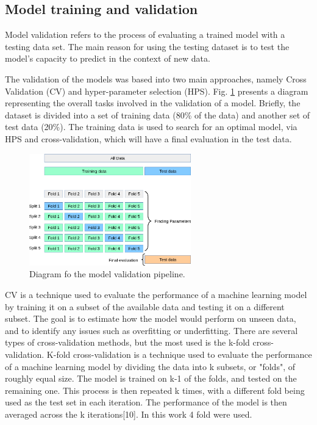 \documentclass[journal]{IEEEtran} %
\begin{document}
\subsection{Model training and validation}

Model validation refers to the process of evaluating a trained model with a testing data set. The main reason for using the testing dataset is to test the model's capacity to predict in the context of new data.

The validation of the models was based into two main approaches, namely Cross Validation (CV) and hyper-parameter selection (HPS). Fig. \ref{fig:cv} presents a diagram representing the overall tasks involved in the validation of a model. Briefly, the dataset is divided into a set of training data (80\% of the data) and another set of test data (20\%). The training data is used to search for an optimal model, via HPS and cross-validation, which will have a final evaluation in the test data.

\begin{figure}[htp]
    \centering
    \includegraphics[width=7cm]{Project2-Report_FAA/figures/grid_search_cross_validation.png}
    \caption{Diagram fo the model validation pipeline.}
    \label{fig:cv}
\end{figure}

CV is a technique used to evaluate the performance of a machine learning model by training it on a subset of the available data and testing it on a different subset. The goal is to estimate how the model would perform on unseen data, and to identify any issues such as overfitting or underfitting. There are several types of cross-validation methods, but the most used is the k-fold cross-validation. K-fold cross-validation is a technique used to evaluate the performance of a machine learning model by dividing the data into k subsets, or "folds", of roughly equal size. The model is trained on k-1 of the folds, and tested on the remaining one. This process is then repeated k times, with a different fold being used as the test set in each iteration. The performance of the model is then averaged across the k iterations[10]. In this work 4 fold were used.
\end{document}
